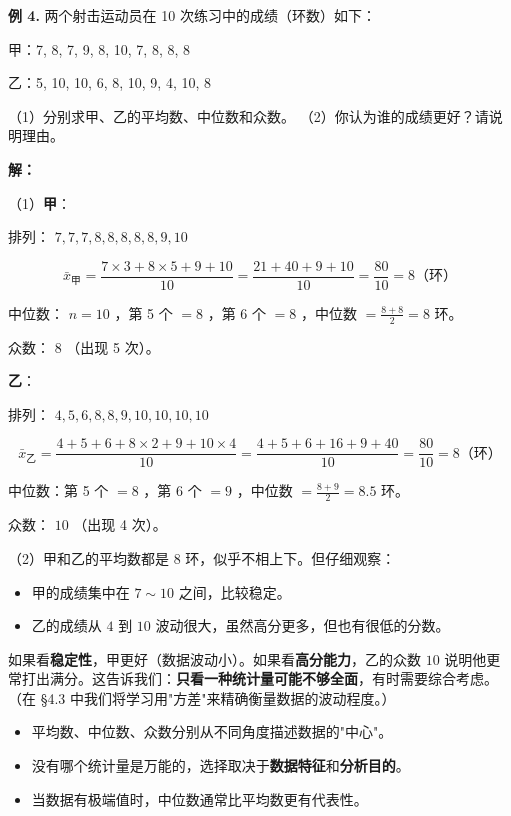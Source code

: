 \begin{workedexamples}


\textbf{例 4.} 两个射击运动员在 10 次练习中的成绩（环数）如下：

甲：7, 8, 7, 9, 8, 10, 7, 8, 8, 8

乙：5, 10, 10, 6, 8, 10, 9, 4, 10, 8

（1）分别求甲、乙的平均数、中位数和众数。
（2）你认为谁的成绩更好？请说明理由。

\textbf{解：}

（1）\textbf{甲}：

排列： $7, 7, 7, 8, 8, 8, 8, 8, 9, 10$

\[
\bar{x}_{\text{甲}} = \frac{7 \times 3 + 8 \times 5 + 9 + 10}{10} = \frac{21 + 40 + 9 + 10}{10} = \frac{80}{10} = 8 \text{（环）}
\]


中位数： $n = 10$ ，第 5 个 $= 8$ ，第 6 个 $= 8$ ，中位数 $= \frac{8+8}{2} = 8$ 环。

众数： $8$ （出现 5 次）。

\textbf{乙}：

排列： $4, 5, 6, 8, 8, 9, 10, 10, 10, 10$

\[
\bar{x}_{\text{乙}} = \frac{4 + 5 + 6 + 8 \times 2 + 9 + 10 \times 4}{10} = \frac{4 + 5 + 6 + 16 + 9 + 40}{10} = \frac{80}{10} = 8 \text{（环）}
\]


中位数：第 5 个 $= 8$ ，第 6 个 $= 9$ ，中位数 $= \frac{8+9}{2} = 8.5$ 环。

众数： $10$ （出现 4 次）。

（2）甲和乙的平均数都是 $8$ 环，似乎不相上下。但仔细观察：

\begin{itemize}
  \item 甲的成绩集中在 $7 \sim 10$ 之间，比较稳定。
  \item 乙的成绩从 $4$ 到 $10$ 波动很大，虽然高分更多，但也有很低的分数。
\end{itemize}


如果看\textbf{稳定性}，甲更好（数据波动小）。如果看\textbf{高分能力}，乙的众数 $10$ 说明他更常打出满分。这告诉我们：\textbf{只看一种统计量可能不够全面}，有时需要综合考虑。（在 §4.3 中我们将学习用"方差"来精确衡量数据的波动程度。）

\end{workedexamples}

\begin{keytakeaway}


\begin{itemize}
  \item 平均数、中位数、众数分别从不同角度描述数据的"中心"。
  \item 没有哪个统计量是万能的，选择取决于\textbf{数据特征}和\textbf{分析目的}。
  \item 当数据有极端值时，中位数通常比平均数更有代表性。
\end{itemize}


\end{keytakeaway}

